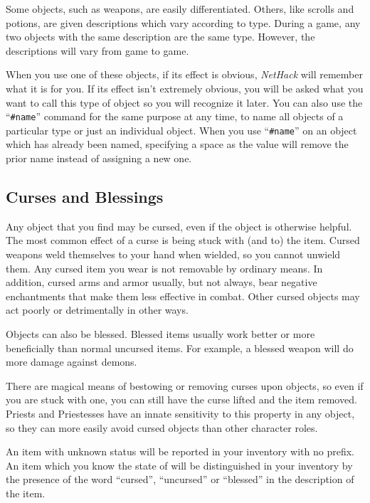Some objects, such as weapons, are easily differentiated.  Others, like
scrolls and potions, are given descriptions which vary according to
type.  During a game, any two objects with the same description are
the same type.  However, the descriptions will vary from game to game.

When you use one of these objects, if its effect is obvious, {\it NetHack\/}
will remember what it is for you.  If its effect isn't extremely
obvious, you will be asked what you want to call this type of object
so you will recognize it later.  You can also use the ``{\tt \#name}''
command for the same purpose at any time, to name all objects of a
particular type or just an individual object.
When you use ``{\tt \#name}'' on an object which has already been named,
specifying a space as the value will remove the prior name instead
of assigning a new one.

\subsection*{Curses and Blessings}

Any object that you find may be cursed, even if the object is
otherwise helpful.  The most common effect of a curse is being stuck
with (and to) the item.  Cursed weapons weld themselves to your hand
when wielded, so you cannot unwield them.  Any cursed item you wear
is not removable by ordinary means.  In addition, cursed arms and armor
usually, but not always, bear negative enchantments that make them
less effective in combat.  Other cursed objects may act poorly or
detrimentally in other ways.

Objects can also be blessed.  Blessed items usually work better or
more beneficially than normal uncursed items.  For example, a blessed
weapon will do more damage against demons.

There are magical means of bestowing or removing curses upon objects,
so even if you are stuck with one, you can still have the curse
lifted and the item removed.  Priests and Priestesses have an innate
sensitivity to this property in any object, so they can more easily avoid
cursed objects than other character roles.

An item with unknown status will be reported in your inventory with no prefix.
An item which you know the state of will be distinguished in your inventory
by the presence of the word ``cursed'', ``uncursed'' or ``blessed'' in the
description of the item.


